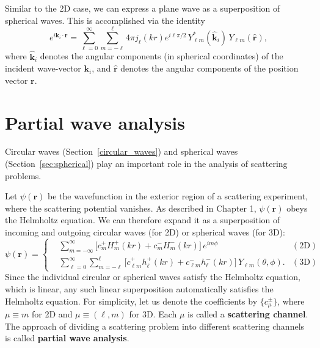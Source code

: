 \documentclass[pra,12pt]{revtex4-2}
\begin{document}
Similar to the 2D case, we can express a plane wave as a superposition
of spherical waves.  This is accomplished via the identity
\begin{equation}
  e^{i\mathbf{k}_i \cdot \mathbf{r}}
  = \sum_{\ell=0}^\infty \sum_{m=-\ell}^\ell 4 \pi j_{\ell}(kr) e^{i\ell\pi/2} \,
  Y_{\ell m}^*(\hat{\mathbf{k}}_i) \, Y_{\ell m}(\hat{\mathbf{r}}),
  \label{plane_wave_decomp}
\end{equation}
where $\hat{\mathbf{k}}_i$ denotes the angular components (in
spherical coordinates) of the incident wave-vector $\mathbf{k}_i$, and
$\hat{\mathbf{r}}$ denotes the angular components of the position
vector $\mathbf{r}$.

\section{Partial wave analysis}
\label{sec:scattering}

Circular waves (Section~\ref{circular_waves}) and spherical waves
(Section~\ref{sec:spherical}) play an important role in the analysis
of scattering problems.

Let $\psi(\mathbf{r})$ be the wavefunction in the exterior region of a
scattering experiment, where the scattering potential vanishes.  As
described in Chapter 1, $\psi(\mathbf{r})$ obeys the Helmholtz
equation.  We can therefore expand it as a superposition of incoming
and outgoing circular waves (for 2D) or spherical waves (for 3D):
\begin{equation}
  \psi(\mathbf{r}) =
  \left\{
  \begin{aligned}
    &\sum_{m=-\infty}^\infty
    \Big[c_m^+ H_m^+(kr) + c_m^- H_m^-(kr)\Big] \, e^{im\phi}
    & (\textrm{2D})
    \\
    &\sum_{\ell = 0}^\infty \sum_{m = - \ell}^\ell
    \Big[c_{\ell m}^+ h_\ell^+(kr) + c_{\ell m}^- h_\ell^-(kr)\Big] \,
    Y_{\ell m}(\theta, \phi). & (\textrm{3D})
  \end{aligned}\right.
  \label{psirdecomp}
\end{equation}
Since the individual circular or spherical waves satisfy the Helmholtz
equation, which is linear, any such linear superposition automatically
satisfies the Helmholtz equation.  For simplicity, let us denote the
coefficients by $\{c_\mu^\pm\}$, where $\mu \equiv m$ for 2D and $\mu
\equiv (\ell, m)$ for 3D.  Each $\mu$ is called a \textbf{scattering
  channel}.  The approach of dividing a scattering problem into
different scattering channels is called \textbf{partial wave
  analysis}.
\end{document}
